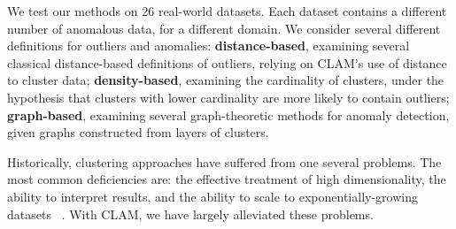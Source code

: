 We test our methods on 26 real-world datasets. 
Each dataset contains a different number of anomalous data, for a different domain.
We consider several different definitions for outliers and anomalies: \textbf{distance-based}, examining several classical distance-based definitions of outliers, relying on CLAM's use of distance to cluster data; \textbf{density-based}, examining the cardinality of clusters, under the hypothesis that clusters with lower cardinality are more likely to contain outliers; \textbf{graph-based}, examining several graph-theoretic methods for anomaly detection, given graphs constructed from layers of clusters.

Historically, clustering approaches have suffered from one several problems.
The most common deficiencies are: the effective treatment of high dimensionality, the ability to interpret results, and the ability to scale to exponentially-growing datasets ~\cite{agrawal1998automatic}.
With CLAM, we have largely alleviated these problems.
